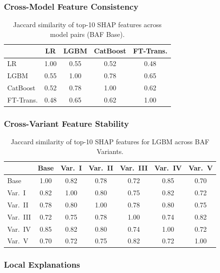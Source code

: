 \subsubsection{Cross-Model Feature Consistency}

\begin{table}[ht]
\centering
\caption{Jaccard similarity of top-10 SHAP features across model pairs (BAF Base).}
\label{tab:shap_consistency}
\begin{tabular}{l c c c c}
\toprule
          & LR   & LGBM & CatBoost & FT-Trans. \\
\midrule
LR        & 1.00 & 0.55 & 0.52     & 0.48 \\
LGBM      & 0.55 & 1.00 & 0.78     & 0.65 \\
CatBoost  & 0.52 & 0.78 & 1.00     & 0.62 \\
FT-Trans. & 0.48 & 0.65 & 0.62     & 1.00 \\
\bottomrule
\end{tabular}
\end{table}

\subsubsection{Cross-Variant Feature Stability}

\begin{table}[ht]
\centering
\caption{Jaccard similarity of top-10 SHAP features for LGBM across BAF Variants.}
\label{tab:shap_stability}
\begin{tabular}{l c c c c c c}
\toprule
         & Base & Var.~I & Var.~II & Var.~III & Var.~IV & Var.~V \\
\midrule
Base     & 1.00 & 0.82 & 0.78 & 0.72 & 0.85 & 0.70 \\
Var.~I   & 0.82 & 1.00 & 0.80 & 0.75 & 0.82 & 0.72 \\
Var.~II  & 0.78 & 0.80 & 1.00 & 0.78 & 0.80 & 0.75 \\
Var.~III & 0.72 & 0.75 & 0.78 & 1.00 & 0.74 & 0.82 \\
Var.~IV  & 0.85 & 0.82 & 0.80 & 0.74 & 1.00 & 0.72 \\
Var.~V   & 0.70 & 0.72 & 0.75 & 0.82 & 0.72 & 1.00 \\
\bottomrule
\end{tabular}
\end{table}

\subsubsection{Local Explanations}

